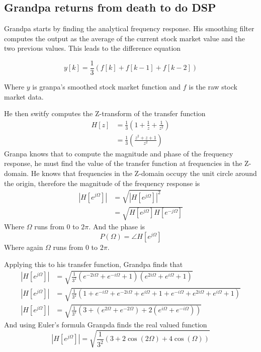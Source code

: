 \subsection{Grandpa returns from death to do DSP}
Grandpa starts by finding the analytical frequency response. His smoothing filter
computes the output as the average of the current stock market value and the two previous
values. This leads to the 
difference equation

\begin{equation}
	y[k] = \frac{1}{3}\left(f[k] + f[k-1] + f[k-2]\right)
\end{equation}

Where \(y\) is granpa's smoothed stock market function and \(f\) is the raw stock market
data.

He then switfy computes the Z-transform of the transfer function 
\begin{align*}
	H[z]&=\frac{1}{3}\left(1+\frac{1}{z}+\frac{1}{z^2}\right) \\
		   &=\frac{1}{3}\left(\frac{z^2+z+1}{z^2}\right)
\end{align*}
Granpa knows that to compute the magnitude and phase of the frequency response, he
must find the value of the transfer function at frequencies in the Z-domain. He knows
that frequencies in the Z-domain occupy the unit circle around the origin, therefore
the magnitude of the frequency response is 
\begin{align*}
\left|H[e^{j\Omega}]\right|&=\sqrt{\left| H[e^{j\Omega}]\right| ^2} \\
							&=\sqrt{H[e^{j\Omega}]H[e^{-j\Omega}]}
\end{align*}
Where \(\Omega\) runs from \(0\) to \(2\pi\).
And the phase is
\begin{equation*}
	P(\Omega)=\angle H[e^{j\Omega}]
\end{equation*}
Where again \(\Omega\) runs from \(0\) to \(2\pi\).

Applying this to his transfer function, Grandpa finds that
\begin{align*}
	\left|H[e^{j\Omega}]\right|&=\sqrt{\frac{1}{3^2}\left(e^{-2i\Omega}+e^{-i\Omega}+1\right)\left(e^{2i\Omega}+e^{i\Omega}+1\right)} \\
	\left|H[e^{j\Omega}]\right|&=\sqrt{\frac{1}{3^2}\left(1+e^{-i\Omega}+e^{-2i\Omega}+e^{i\Omega}+1+e^{-i\Omega}+e^{2i\Omega}+e^{i\Omega}+1\right)} \\
	\left|H[e^{j\Omega}]\right|&=\sqrt{\frac{1}{3^2}\left(3+\left(e^{2\Omega}+e^{-2\Omega}\right)+2\left(e^{i\Omega}+e^{-i\Omega}\right)\right)}
\end{align*}
And using Euler's formula Granpda finds the real valued function
\begin{equation*}
	\left|H[e^{j\Omega}]\right|=\sqrt{\frac{1}{3^2}\left(3+2\cos(2\Omega)+4\cos(\Omega)\right)}
\end{equation*}
